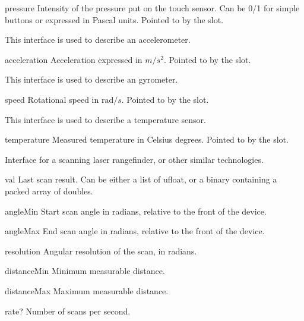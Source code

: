 \begin{urbiscriptapi}
\item[pressure] Intensity of the pressure put on the touch sensor. Can be
  0/1 for simple buttons or expressed in Pascal units. Pointed to by the
   slot.
\end{urbiscriptapi}



This interface is used to describe an accelerometer.

\begin{urbiscriptapi}
\item[acceleration] Acceleration expressed in $m/s^2$.  Pointed to by the
   slot.
\end{urbiscriptapi}

This interface is used to describe an gyrometer.

\begin{urbiscriptapi}
\item[speed] Rotational speed in $\mathrm{rad}/s$.  Pointed to by the
   slot.
\end{urbiscriptapi}

This interface is used to describe a temperature sensor.

\begin{urbiscriptapi}
\item[temperature] Measured temperature in Celsius degrees.  Pointed to by
  the  slot.
\end{urbiscriptapi}

Interface for a scanning laser rangefinder, or other similar technologies.

\begin{urbiscriptapi}
\item[val] Last scan result. Can be either a list of ufloat, or a binary
  containing a packed array of doubles.

\item[angleMin] Start scan angle in radians, relative to the front of the
  device.

\item[angleMax] End scan angle in radians, relative to the front of the
  device.

\item[resolution] Angular resolution of the scan, in radians.

\item[distanceMin] Minimum measurable distance.

\item[distanceMax] Maximum measurable distance.

\item[rate?] Number of scans per second.
\end{urbiscriptapi}


